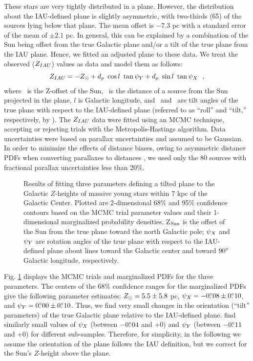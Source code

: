 \documentclass[12pt,preprint]{aastex}
\def\deg  {\ifmmode {^\circ}\else {$^\circ$}\fi}
\def\eg   {e.g.,~}
\def\d    {\ifmmode {{\rlap{.}}^\circ}\else {${\rlap{.}}^\circ$}\fi}
\def\Dp    {\ifmmode{d_p}\else{$d_p$}\fi}
\def\Zsun  {\ifmmode {Z_\odot}\else {$Z_\odot$}\fi}
\def\Ytilt {\ifmmode{\psi_Y}\else{$\psi_Y$}\fi}
\def\Xtilt {\ifmmode{\psi_X}\else{$\psi_X$}\fi}
\def\ZIAU  {\ifmmode {Z_{IAU}}\else {$Z_{IAU}$}\fi}
\begin{document}
These stars are very tightly distributed in a plane.  However, the distribution about  
the IAU-defined plane is slightly asymmetric, with two-thirds (65) of the sources 
lying below that plane.  The mean offset is $-7.3$ pc with a standard error 
of the mean of $\pm2.1$ pc.  In general, this can be explained by a combination
of the Sun being offset from the true Galactic plane and/or a tilt of the true 
plane from the IAU plane.  Hence, we fitted an adjusted plane to these data.
We treat the observed ($\ZIAU$) values as data and model them as follows:
$$\ZIAU = -\Zsun + \Dp~\cos l~\tan\Ytilt + \Dp~\sin l~\tan\Xtilt~~,$$
where \Zsun\ is the Z-offset of the Sun, \Dp\ is the distance
of a source from the Sun projected in the plane, $l$ is Galactic
longitude, and \Xtilt\ and \Ytilt\ are tilt angles of
the true plane with respect to the IAU-defined plane (referred to as ``roll'' 
and ``tilt,'' respectively, by \citet{Anderson:19}).  
The $\ZIAU$ data were fitted using an MCMC technique, accepting or
rejecting trials with the Metropolis-Hastings algorithm.  Data uncertainties 
were based on parallax uncertainties and assumed to be Gaussian.  
In order to minimize the effects of distance biases, 
owing to asymmetric distance PDFs when converting parallaxes to distances 
\citep[\eg][]{Bailer-Jones:15}, we used only the 80 sources with fractional parallax 
uncertainties less than 20\%.

\begin{figure}[htp]
\caption{\small
Results of fitting three parameters defining a tilted plane to the 
Galactic $Z$-heights of massive young stars within 7 kpc of the Galactic Center.  
Plotted are 2-dimensional 68\% and 95\% confidence contours based on the 
MCMC trial parameter values and their 1-dimensional marginalized
probability densities.  Z$_{\rm Sun}$ is the offset of the Sun from the
true plane toward the north Galactic pole; $\Xtilt$ and $\Ytilt$ are 
rotation angles of the true plane with respect to the IAU-defined plane
about lines toward the Galactic center and toward $90\deg$
Galactic longitude, respectively. 
        }
\label{fig:plane_pdfs}
\end{figure}

Fig. \ref{fig:plane_pdfs} displays the MCMC trials and marginalized PDFs for the 
three parameters.  The centers of the 68\% confidence ranges for the marginalized 
PDFs give the following parameter estimates:
$\Zsun = 5.5 \pm 5.8$ pc, $\Xtilt =-0\d08 \pm 0\d10$, and
$\Ytilt = 0\d00 \pm 0\d10$. Thus, we find very small changes in the 
orientation (``tilt'' parameters) of the true Galactic plane relative to the 
IAU-defined plane.  \citet{Anderson:19} find similarly small values of
$\Xtilt$ (between $-0\d04$ and +0\d15) and $\Ytilt$ (between $-0\d11$ and 
+0\d08) for different sub-samples.  Therefore, for simplicity, in the
following we assume the orientation of the plane follows the IAU definition,
but we correct for the Sun's $Z$-height above the plane.
\end{document}
